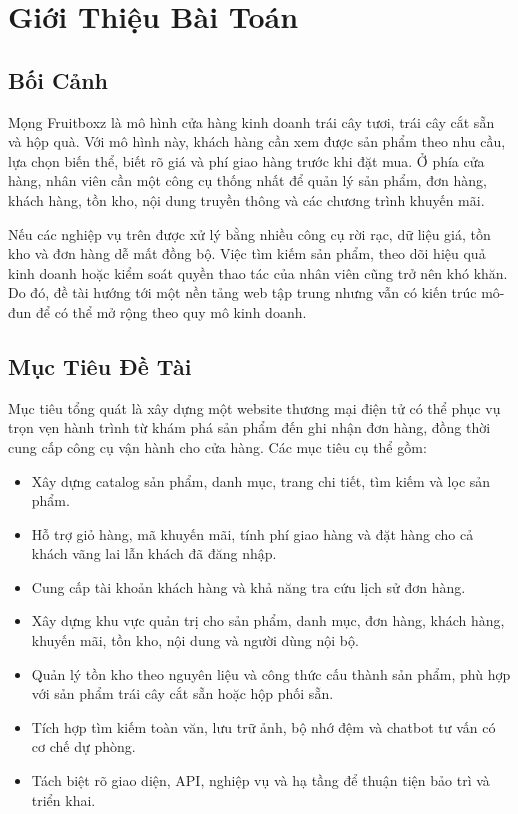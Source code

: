\chapter{Giới Thiệu Bài Toán}

\section{Bối Cảnh}

Mọng Fruitboxz là mô hình cửa hàng kinh doanh trái cây tươi, trái cây cắt sẵn và hộp quà. Với mô hình này, khách hàng cần xem được sản phẩm theo nhu cầu, lựa chọn biến thể, biết rõ giá và phí giao hàng trước khi đặt mua. Ở phía cửa hàng, nhân viên cần một công cụ thống nhất để quản lý sản phẩm, đơn hàng, khách hàng, tồn kho, nội dung truyền thông và các chương trình khuyến mãi.

Nếu các nghiệp vụ trên được xử lý bằng nhiều công cụ rời rạc, dữ liệu giá, tồn kho và đơn hàng dễ mất đồng bộ. Việc tìm kiếm sản phẩm, theo dõi hiệu quả kinh doanh hoặc kiểm soát quyền thao tác của nhân viên cũng trở nên khó khăn. Do đó, đề tài hướng tới một nền tảng web tập trung nhưng vẫn có kiến trúc mô-đun để có thể mở rộng theo quy mô kinh doanh.

\section{Mục Tiêu Đề Tài}

Mục tiêu tổng quát là xây dựng một website thương mại điện tử có thể phục vụ trọn vẹn hành trình từ khám phá sản phẩm đến ghi nhận đơn hàng, đồng thời cung cấp công cụ vận hành cho cửa hàng. Các mục tiêu cụ thể gồm:

\begin{itemize}[leftmargin=2em, itemsep=3pt]
  \item Xây dựng catalog sản phẩm, danh mục, trang chi tiết, tìm kiếm và lọc sản phẩm.
  \item Hỗ trợ giỏ hàng, mã khuyến mãi, tính phí giao hàng và đặt hàng cho cả khách vãng lai lẫn khách đã đăng nhập.
  \item Cung cấp tài khoản khách hàng và khả năng tra cứu lịch sử đơn hàng.
  \item Xây dựng khu vực quản trị cho sản phẩm, danh mục, đơn hàng, khách hàng, khuyến mãi, tồn kho, nội dung và người dùng nội bộ.
  \item Quản lý tồn kho theo nguyên liệu và công thức cấu thành sản phẩm, phù hợp với sản phẩm trái cây cắt sẵn hoặc hộp phối sẵn.
  \item Tích hợp tìm kiếm toàn văn, lưu trữ ảnh, bộ nhớ đệm và chatbot tư vấn có cơ chế dự phòng.
  \item Tách biệt rõ giao diện, API, nghiệp vụ và hạ tầng để thuận tiện bảo trì và triển khai.
\end{itemize}

